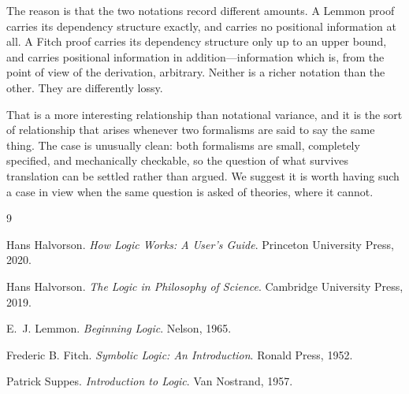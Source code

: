 \documentclass[11pt]{article}
\theoremstyle{plain}
\theoremstyle{definition}
\theoremstyle{remark}
\begin{document}
The reason is that the two notations record different amounts. A Lemmon proof
carries its dependency structure exactly, and carries no positional
information at all. A Fitch proof carries its dependency structure only up to
an upper bound, and carries positional information in addition---information
which is, from the point of view of the derivation, arbitrary. Neither is a
richer notation than the other. They are differently lossy.

That is a more interesting relationship than notational variance, and it is
the sort of relationship that arises whenever two formalisms are said to say
the same thing. The case is unusually clean: both formalisms are small,
completely specified, and mechanically checkable, so the question of what
survives translation can be settled rather than argued. We suggest it is worth
having such a case in view when the same question is asked of theories, where
it cannot.

\begin{thebibliography}{9}

Hans Halvorson.
\emph{How Logic Works: A User's Guide}.
Princeton University Press, 2020.

Hans Halvorson.
\emph{The Logic in Philosophy of Science}.
Cambridge University Press, 2019.

E.~J. Lemmon.
\emph{Beginning Logic}.
Nelson, 1965.

Frederic B. Fitch.
\emph{Symbolic Logic: An Introduction}.
Ronald Press, 1952.

Patrick Suppes.
\emph{Introduction to Logic}.
Van Nostrand, 1957.

\end{thebibliography}
\end{document}
